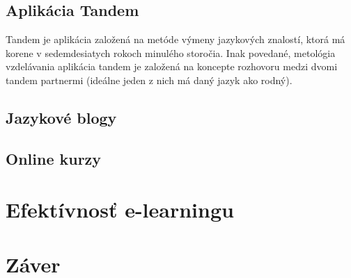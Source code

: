 \documentclass[10pt,oneside,slovak,a4paper]{article}
\begin{document}
\subsection{Aplikácia Tandem}
\cite{tandem}
Tandem je aplikácia založená na metóde výmeny jazykových znalostí, ktorá má korene v sedemdesiatych rokoch minulého storočia. Inak povedané, metológia vzdelávania aplikácia tandem je založená na koncepte rozhovoru medzi dvomi tandem partnermi (ideálne jeden z nich má daný jazyk ako rodný).

\subsection{Jazykové blogy}
\cite{blog}
\cite{blog-mif}
\subsection{Online kurzy}

\section{Efektívnosť e-learningu}
\cite{duolingo}
\cite{efektivnost}
\section{Záver}



\end{document}
